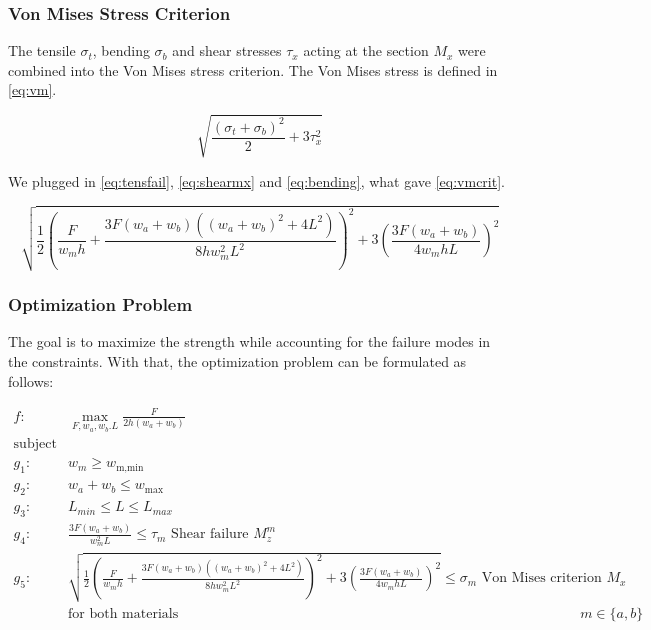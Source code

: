 \subsubsection{Von Mises Stress Criterion}
The tensile $\sigma_t$, bending $\sigma_b$ and shear stresses $\tau_x$ acting at the section $M_x$ were combined into the Von Mises stress criterion. The Von Mises stress is defined in \autoref{eq:vm}.

\begin{equation}
	\label{eq:vm}
	\sqrt{\frac{\left( \sigma_t + \sigma_b \right)^2}{2} + 3\tau_x ^2}
\end{equation}

We plugged in \autoref{eq:tensfail}, \ref{eq:shearmx} and \ref{eq:bending}, what gave \ref{eq:vmcrit}.

\begin{equation}
	\label{eq:vmcrit}
	\sqrt{\frac{1}{2} \left( \frac{F}{w_m  h} + 	\frac{ 3 F \left(w_a + w_b \right) \left(\left(w_a + w_b \right) ^2 + 4L^2 \right)  }{ 8h w_m^2 L^2 }   \right)^2+ 3\left(	\frac{ 3 F \left(w_a + w_b \right) }{ 4  w_m h L }  \right) ^2}
\end{equation}


\subsubsection{Optimization Problem}
The goal is to maximize the strength while accounting for the failure modes in the constraints.
With that, the optimization problem can be formulated as follows:

\begin{align*}
	f: & \max_{F, {w_a}, {w_b}. L} \frac{F}{2h \left(w_a + w_b\right)} \nonumber \\
	\text{subject to:} & \nonumber \\
	g_1: & w_m \ge w_\text{m,min} \\
	g_2: & w_a + w_b \le w_\text{max} \\
	g_3: & L_{min} \le L \le L_{max} \\
	g_4: & \frac{ 3 F \left(w_a + w_b \right) }{ w_m ^2 L} \le \tau_m						\text{ Shear failure } M_z^m \\
	g_5:& \sqrt{\frac{1}{2} \left( \frac{F}{w_m  h} + 	\frac{ 3 F \left(w_a + w_b \right) \left(\left(w_a + w_b \right) ^2 + 4L^2 \right)  }{ 8h w_m^2 L^2 }   \right)^2+ 3\left(	\frac{ 3 F \left(w_a + w_b \right) }{ 4  w_m h L}  \right) ^2}		\le 	\sigma_m	\text{ Von Mises criterion } M_x \\
	& \text{for both materials } && m \in \{a, b\} \nonumber 
\end{align*}


